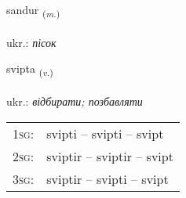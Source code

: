 \documentclass[frontgrid, backgrid]{flacards}\usepackage[]{graphicx}\usepackage[]{xcolor}
\begin{document}
\renewcommand{\flhead}{\vskip5pt \fboxsep=0pt {\small\bfseries\footnotesize Nafnorð | іменник}}
\renewcommand{\fcfoot}{\vskip5pt \fboxsep=0pt \hspace{2pt}{\small\bfseries\footnotesize 3K}}

\renewcommand{\blhead}{\vskip5pt {\small\bfseries\footnotesize Nafnorð | іменник }}
\renewcommand{\bcfoot}{\vskip5pt \hspace{2pt}{\small\bfseries\footnotesize 3K}}


{sandur \small{\textsubscript{(\textit{m.})}} \\[1ex] %
\textphonetic{[santʏr]} \\
ukr.: \emph{пісок} \\  [2ex]
\renewcommand*{\arraystretch}{0.8}
}

\renewcommand{\flhead}{\vskip5pt \fboxsep=0pt {\small\bfseries\footnotesize Sagnorð | дієслово}}
\renewcommand{\fcfoot}{\vskip5pt \fboxsep=0pt \hspace{2pt}{\small\bfseries\footnotesize 3K}}

\renewcommand{\blhead}{\vskip5pt {\small\bfseries\footnotesize Sagnorð | дієслово }}
\renewcommand{\bcfoot}{\vskip5pt \hspace{2pt}{\small\bfseries\footnotesize 3K}}


{svipta \small{\textsubscript{(\textit{v.})}} \\[1ex] %
\textphonetic{[svɪfta]} \\
ukr.: \emph{відбирати; позбавляти} \\  [2ex]
\renewcommand*{\arraystretch}{0.8}
\begin{tabular}{p{1cm}l}
\textsc{1sg}: & svipti -- svipti -- svipt \\ 
\textsc{2sg}: & sviptir -- sviptir -- svipt \\ 
\textsc{3sg}: & sviptir -- svipti -- svipt \\ 
\end{tabular}
}
\end{document}
